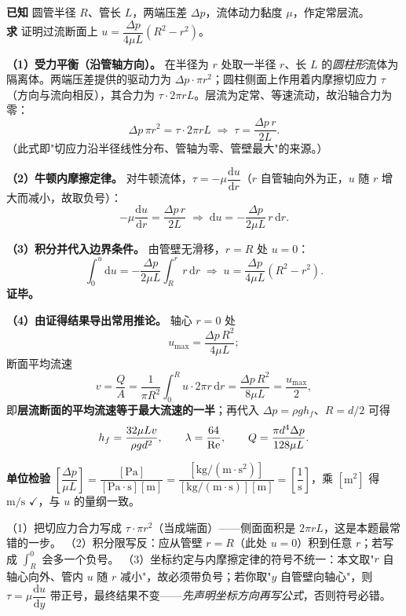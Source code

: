 \begin{jie}
\textbf{已知} 圆管半径 $R$、管长 $L$，两端压差 $\Delta p$，流体动力黏度 $\mu$，作定常层流。\\
\textbf{求} 证明过流断面上 $u=\dfrac{\Delta p}{4\mu L}\left(R^2-r^2\right)$。

\textbf{（1）受力平衡（沿管轴方向）。} 在半径为 $r$ 处取一半径 $r$、长 $L$ 的\emph{圆柱形}流体为隔离体。两端压差提供的驱动力为 $\Delta p\cdot\pi r^2$；圆柱侧面上作用着内摩擦切应力 $\tau$（方向与流向相反），其合力为 $\tau\cdot2\pi rL$。层流为定常、等速流动，故沿轴合力为零：
\[\Delta p\,\pi r^2=\tau\cdot 2\pi rL\;\Longrightarrow\;\tau=\frac{\Delta p\,r}{2L}.\]
（此式即"切应力沿半径线性分布、管轴为零、管壁最大"的来源。）

\textbf{（2）牛顿内摩擦定律。} 对牛顿流体，$\tau=-\mu\dfrac{\mathrm{d}u}{\mathrm{d}r}$（$r$ 自管轴向外为正，$u$ 随 $r$ 增大而减小，故取负号）：
\[-\mu\frac{\mathrm{d}u}{\mathrm{d}r}=\frac{\Delta p\,r}{2L}\;\Longrightarrow\;\mathrm{d}u=-\frac{\Delta p}{2\mu L}\,r\,\mathrm{d}r.\]

\textbf{（3）积分并代入边界条件。} 由管壁无滑移，$r=R$ 处 $u=0$：
\[\int_0^u \mathrm{d}u=-\frac{\Delta p}{2\mu L}\int_R^r r\,\mathrm{d}r
\;\Longrightarrow\;u=\frac{\Delta p}{4\mu L}\left(R^2-r^2\right).\]
\textbf{证毕。}

\textbf{（4）由证得结果导出常用推论。} 轴心 $r=0$ 处
\[u_{\max}=\frac{\Delta p\,R^2}{4\mu L};\]
断面平均流速
\[v=\frac{Q}{A}=\frac{1}{\pi R^2}\int_0^R u\cdot2\pi r\,\mathrm{d}r
=\frac{\Delta p\,R^2}{8\mu L}=\frac{u_{\max}}{2},\]
即\textbf{层流断面的平均流速等于最大流速的一半}；再代入 $\Delta p=\rho g h_f$、$R=d/2$ 可得
\[h_f=\frac{32\mu Lv}{\rho g d^2},\qquad \lambda=\frac{64}{\mathrm{Re}},\qquad Q=\frac{\pi d^4\Delta p}{128\mu L}.\]

\textbf{单位检验} $\left[\dfrac{\Delta p}{\mu L}\right]=\dfrac{[\mathrm{Pa}]}{[\mathrm{Pa\cdot s}][\mathrm{m}]}
=\dfrac{[\mathrm{kg/(m\cdot s^2)}]}{[\mathrm{kg/(m\cdot s)}][\mathrm{m}]}
=\left[\dfrac{1}{\mathrm{s}}\right]$，乘 $[\mathrm{m^2}]$ 得 $\mathrm{m/s}$ $\checkmark$，与 $u$ 的量纲一致。
\end{jie}
\begin{yicuo}
（1）把切应力合力写成 $\tau\cdot\pi r^2$（当成端面）——侧面面积是 $2\pi rL$，这是本题最常错的一步。
（2）积分限写反：应从管壁 $r=R$（此处 $u=0$）积到任意 $r$；若写成 $\int_R^0$ 会多一个负号。
（3）坐标约定与内摩擦定律的符号不统一：本文取"$r$ 自轴心向外、管内 $u$ 随 $r$ 减小"，故必须带负号；若你取"$y$ 自管壁向轴心"，则 $\tau=\mu\dfrac{\mathrm{d}u}{\mathrm{d}y}$ 带正号，最终结果不变——\emph{先声明坐标方向再写公式}，否则符号必错。
\end{yicuo}
